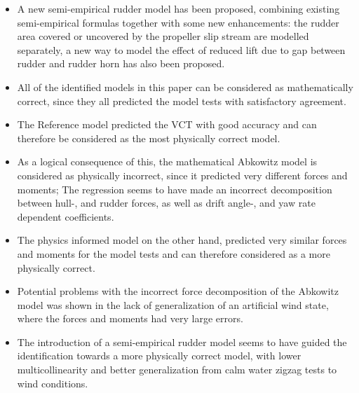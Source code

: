 \begin{itemize}
    \item A new semi-empirical rudder model has been proposed, combining existing semi-empirical formulas together with some new enhancements: the rudder area covered or uncovered by the propeller slip stream are modelled separately, a new way to model the effect of reduced lift due to gap between rudder and rudder horn has also been proposed.     

    \item All of the identified models in this paper can be considered as mathematically correct, since they all predicted the model tests with satisfactory agreement.
    
    \item The Reference model predicted the VCT with good accuracy and can therefore be considered as the most physically correct model.   
    \item As a logical consequence of this, the mathematical Abkowitz model is considered as physically incorrect, since it predicted very different forces and moments; The regression seems to have made an incorrect decomposition between hull-, and rudder forces, as well as drift angle-, and yaw rate dependent coefficients.  
    \item The physics informed model on the other hand, predicted very similar forces and moments for the model tests and can therefore considered as a more physically correct.
    \item Potential problems with the incorrect force decomposition of the Abkowitz model was shown in the lack of generalization of an artificial wind state, where the forces and moments had very large errors. 
    \item The introduction of a semi-empirical rudder model seems to have guided the identification towards a more physically correct model, with lower multicollinearity and better generalization from calm water zigzag tests to wind conditions. 
\end{itemize}